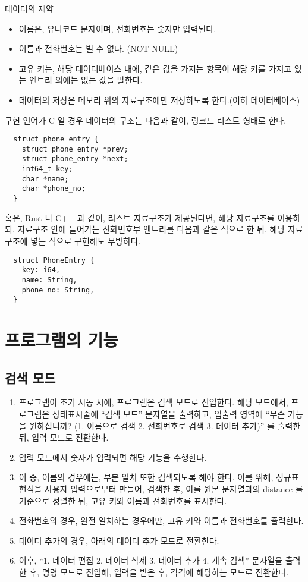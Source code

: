 \documentclass {article}
\begin{document}
데이터의 제약
\begin{itemize}
\item 이름은, 유니코드 문자이며, 전화번호는 숫자만 입력된다.
\item 이름과 전화번호는 빌 수 없다. (NOT NULL)
\item 고유 키는, 해당 데이터베이스 내에, 같은 값을 가지는 항목이 해당 키를 가지고 있는 엔트리 외에는 없는 값을 말한다.
\item 데이터의 저장은 메모리 위의 자료구조에만 저장하도록 한다.(이하 데이터베이스)
\end{itemize}

구현 언어가 C 일 경우 데이터의 구조는 다음과 같이, 링크드 리스트 형태로 한다.
\begin{lstlisting}
  struct phone_entry {
    struct phone_entry *prev;
    struct phone_entry *next;
    int64_t key;
    char *name;
    char *phone_no;
  }
\end{lstlisting}
혹은, Rust 나 C++ 과 같이, 리스트 자료구조가 제공된다면, 해당 자료구조를 이용하되, 자료구조 안에 들어가는 전화번호부 엔트리를 다음과 같은 식으로 한 뒤, 해당 자료구조에 넣는 식으로 구현해도 무방하다.
\begin{lstlisting}
  struct PhoneEntry {
    key: i64,
    name: String,
    phone_no: String,
  }
\end{lstlisting}
\section{프로그램의 기능}
\subsection{검색 모드}
\begin{enumerate}
\item 프로그램이 초기 시동 시에, 프로그램은 검색 모드로 진입한다. 해당 모드에서, 프로그램은 상태표시줄에 ``검색 모드'' 문자열을 출력하고, 입출력 영역에 ``무슨 기능을 원하십니까? (1. 이름으로 검색 2. 전화번호로 검색 3. 데이터 추가)'' 를 출력한 뒤, 입력 모드로 전환한다.
\item 입력 모드에서 숫자가 입력되면 해당 기능을 수행한다.
\item 이 중, 이름의 경우에는, 부분 일치 또한 검색되도록 해야 한다. 이를 위해, 정규표현식을 사용자 입력으로부터 만들어, 검색한 후, 이를 원본 문자열과의 distance 를 기준으로 정렬한 뒤, 고유 키와 이름과 전화번호를 표시한다.
\item 전화번호의 경우, 완전 일치하는 경우에만, 고유 키와 이름과 전화번호를 출력한다.
\item 데이터 추가의 경우, 아래의 데이터 추가 모드로 전환한다.
\item 이후, ``1. 데이터 편집 2. 데이터 삭제 3. 데이터 추가 4. 계속 검색'' 문자열을 출력한 후, 명령 모드로 진입해, 입력을 받은 후, 각각에 해당하는 모드로 전환한다.
\end{enumerate}
\end{document}
